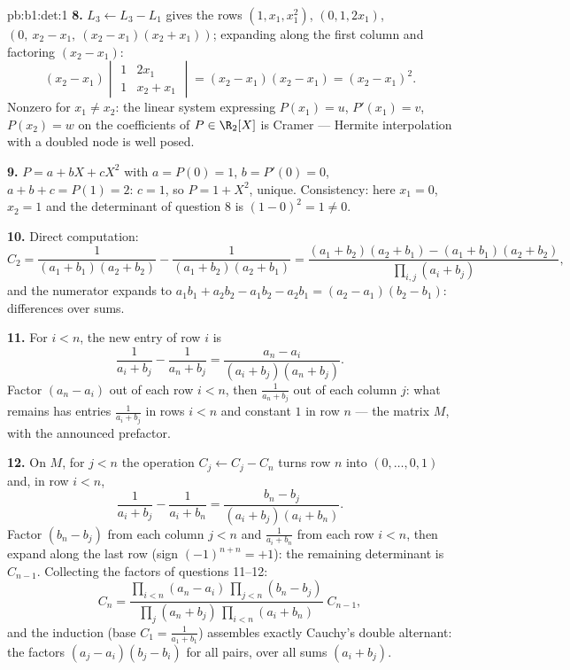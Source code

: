 \begin{solution}{pb:b1:det:1}
\textbf{8.} $L_3 \leftarrow L_3 - L_1$ gives the rows $(1, x_1,
x_1^2)$, $(0, 1, 2x_1)$, $(0,\ x_2 - x_1,\ (x_2-x_1)(x_2+x_1))$;
expanding along the first column and factoring $(x_2 - x_1)$:
\[
(x_2 - x_1)\begin{vmatrix} 1 & 2x_1\\ 1 & x_2 + x_1
\end{vmatrix} = (x_2 - x_1)(x_2 - x_1) = (x_2 - x_1)^2 .
\]
Nonzero for $x_1 \neq x_2$: the linear system expressing
$P(x_1) = u$, $P'(x_1) = v$, $P(x_2) = w$ on the coefficients of
$P \in \R_2[X]$ is Cramer --- Hermite interpolation with a
doubled node is well posed.

\textbf{9.} $P = a + bX + cX^2$ with $a = P(0) = 1$, $b = P'(0)
= 0$, $a + b + c = P(1) = 2$: $c = 1$, so $P = 1 + X^2$, unique.
Consistency: here $x_1 = 0$, $x_2 = 1$ and the determinant of
question 8 is $(1 - 0)^2 = 1 \neq 0$.

\textbf{10.} Direct computation:
\[
C_2 = \frac{1}{(a_1+b_1)(a_2+b_2)} - \frac{1}{(a_1+b_2)(a_2+b_1)}
= \frac{(a_1+b_2)(a_2+b_1) - (a_1+b_1)(a_2+b_2)}
{\prod_{i,j}(a_i+b_j)} ,
\]
and the numerator expands to $a_1b_1 + a_2b_2 - a_1b_2 - a_2b_1
= (a_2 - a_1)(b_2 - b_1)$: differences over sums.

\textbf{11.} For $i < n$, the new entry of row $i$ is
\[
\frac{1}{a_i + b_j} - \frac{1}{a_n + b_j}
= \frac{a_n - a_i}{(a_i + b_j)(a_n + b_j)} .
\]
Factor $(a_n - a_i)$ out of each row $i < n$, then
$\frac1{a_n + b_j}$ out of each column $j$: what remains has
entries $\frac1{a_i + b_j}$ in rows $i < n$ and constant $1$ in
row $n$ --- the matrix $M$, with the announced prefactor.

\textbf{12.} On $M$, for $j < n$ the operation $C_j \leftarrow
C_j - C_n$ turns row $n$ into $(0, \dots, 0, 1)$ and, in row $i
< n$,
\[
\frac{1}{a_i + b_j} - \frac{1}{a_i + b_n}
= \frac{b_n - b_j}{(a_i + b_j)(a_i + b_n)} .
\]
Factor $(b_n - b_j)$ from each column $j < n$ and $\frac1{a_i +
b_n}$ from each row $i < n$, then expand along the last row
(sign $(-1)^{n+n} = +1$): the remaining determinant is
$C_{n-1}$. Collecting the factors of questions 11--12:
\[
C_n = \frac{\prod_{i<n}(a_n - a_i)\,\prod_{j<n}(b_n - b_j)}
{\prod_{j}(a_n + b_j)\,\prod_{i<n}(a_i + b_n)}\;C_{n-1},
\]
and the induction (base $C_1 = \frac1{a_1+b_1}$) assembles
exactly Cauchy's double alternant: the factors $(a_j - a_i)(b_j
- b_i)$ for all pairs, over all sums $(a_i + b_j)$.


\end{solution}
